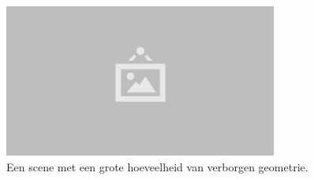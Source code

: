 \begin{figure}
  \centering
  \includegraphics[width=0.8\textwidth]{./img/raw/placeholder.png}
  \caption{Een scene met een grote hoeveelheid van verborgen geometrie.}
  \label{fig:fds-scene}
\end{figure}
